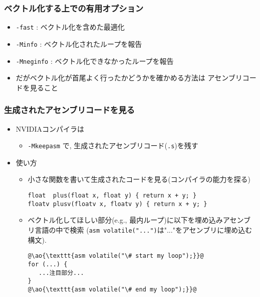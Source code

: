 \documentclass[10pt,dvipdfmx]{beamer}
\newcommand{\ao}[1]{{\color{blue}#1}}
\begin{document}
\begin{frame}
  \frametitle{ベクトル化する上での有用オプション}
  \begin{itemize}
  \item \ao{\tt -fast} : ベクトル化を含めた最適化
  \item \ao{\tt -Minfo} : ベクトル化されたループを報告
  \item \ao{\tt -Mneginfo} : ベクトル化できなかったループを報告
  \item だがベクトル化が首尾よく行ったかどうかを確かめる方法は
    アセンブリコードを見ること
  \end{itemize}
\end{frame}

\begin{frame}[fragile]
  \frametitle{生成されたアセンブリコードを見る}
  \begin{itemize}
  \item NVIDIAコンパイラは
    \begin{itemize}
    \item \ao{\tt -Mkeepasm} で, 生成されたアセンブリコード(\ao{\texttt{.s}})を残す
    \end{itemize}
  \item 使い方
    \begin{itemize}
    \item 小さな関数を書いて生成されたコードを見る(コンパイラの能力を探る)
\begin{lstlisting}
float  plus(float x, float y) { return x + y; }
floatv plusv(floatv x, floatv y) { return x + y; }
\end{lstlisting}
\item ベクトル化してほしい部分(e.g., 最内ループ)に以下を埋め込みアセンブリ言語の中で検索
  (\texttt{asm volatile("...")}は"..."をアセンブリに埋め込む構文).
\begin{lstlisting}
@\ao{\texttt{asm volatile("\# start my loop");}}@
for (...) {
   ...注目部分...
}
@\ao{\texttt{asm volatile("\# end my loop");}}@
\end{lstlisting}
\end{itemize}
\end{itemize}
\end{frame}
\end{document}
